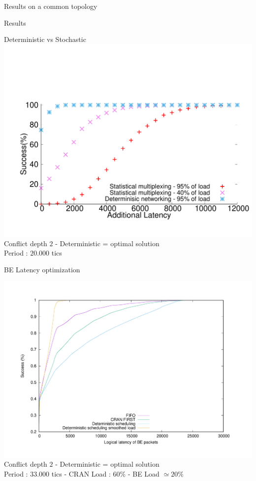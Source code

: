 \documentclass[10 pt]{beamer}
\begin{document}
\begin{section}{Results on a common topology}
\begin{subsection}{Results}

  
    \begin{frame}{Deterministic vs Stochastic}
\centering
\vspace{-2cm}
  \includegraphics[scale=0.4]{stochastic.pdf}\\
  
  Conflict depth $2$ - Deterministic = optimal solution\\
  Period : $20.000$ tics 
  \end{frame}
  
      \begin{frame}{BE Latency optimization}
\centering

  \includegraphics[scale=0.3]{res.pdf}\\
  
   Conflict depth $2$ - Deterministic = optimal solution\\
  Period : $33.000$ tics - CRAN Load : $60\%$ - BE Load $\simeq 20\%$
  \end{frame}

\end{subsection}


\end{section}
\end{document}
